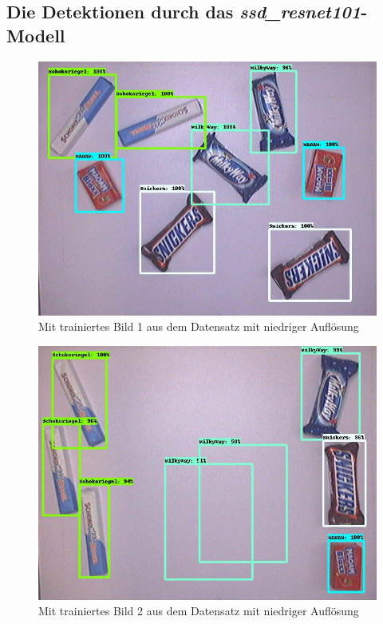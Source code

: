     \subsection{Die Detektionen durch das \textit{ssd\_resnet101}-Modell}
    
    \begin{figure}[H]
        \vspace{-5mm}
        \centering
        \includegraphics[angle = 90, height = 0.85\textheight]{Bilder/models/model_comparison/ssd_resnet101_v1_fpn_640x640_coco17_tpu-8/trained_1.jpg}
        \caption{Mit trainiertes Bild 1 aus dem Datensatz mit niedriger Auflösung}
    \end{figure}
    
    \begin{figure}[H]
        \centering
        \includegraphics[angle = 90, width = \textwidth]{Bilder/models/model_comparison/ssd_resnet101_v1_fpn_640x640_coco17_tpu-8/trained_2.jpg}
        \caption{Mit trainiertes Bild 2 aus dem Datensatz mit niedriger Auflösung}
    \end{figure}
    
